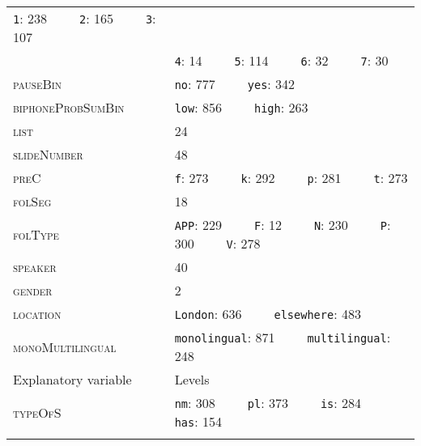 \begin{table}[H]
\begin{tabular}{ll}
\texttt{1}: 238~ ~ ~ \texttt{2}: 165~ ~ ~ \texttt{3}: 107             \\
                                      & \texttt{4}: 14~ ~ ~ \texttt{5}: 114~ ~ ~ \texttt{6}: 32~ ~ ~ \texttt{7}: 30                  \\
\textsc{pauseBin}                              & \texttt{no}: 777~ ~ ~ \texttt{yes}: 342                                    \\
\textsc{biphoneProbSumBin}                     & \texttt{low}: 856~ ~ ~ \texttt{high}: 263                                  \\
\textsc{list}                                  & 24                                                       \\
\textsc{slideNumber}                           & 48                                                       \\
\textsc{preC}                                  & \texttt{f}: 273~ ~ ~ \texttt{k}: 292~ ~ ~ \texttt{p}: 281~ ~ ~ \texttt{t}: 273               \\
\textsc{folSeg}                                & 18                                                       \\
\textsc{folType}                               & \texttt{APP}: 229~ ~ ~ \texttt{F}: 12~ ~ ~ \texttt{N}: 230~ ~ ~ \texttt{P}: 300~ ~ ~ \texttt{V}: 278  \\
\textsc{speaker}                               & 40                                                       \\
\textsc{gender}                                & 2                                                        \\
\textsc{location}                              & \texttt{London}: 636~ ~ ~ \texttt{elsewhere}: 483                          \\
\textsc{monoMultilingual}                      & \texttt{monolingual}: 871~ ~ ~ \texttt{multilingual}: 248                  \\
\midrule
Explanatory variable                  & Levels                                                   \\
\midrule
\textsc{typeOfS}                               & \texttt{nm}: 308~ ~ ~ \texttt{pl}: 373~ ~ ~ \texttt{is}: 284~ ~ ~ \texttt{has}: 154   \\      
\lspbottomrule
\end{tabular}
\end{table}



